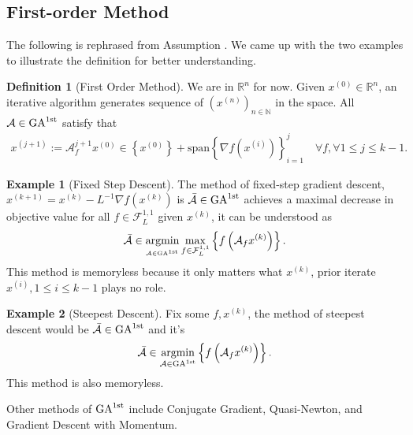 \documentclass[]{article}
\theoremstyle{definition}
\newtheorem{definition}{Definition}
\newtheorem{exmp}{Example}[section]
\numberwithin{equation}{subsection}
\begin{document}
    \subsection{First-order Method}
        The following is rephrased from Assumption \cite[2.1.4]{nesterov_lecture_2018}. 
        We came up with the two examples to illustrate the definition for better understanding. 
        \begin{definition}[First Order Method]
            We are in $\mathbb R^n$ for now. Given $x^{(0)} \in \mathbb R^n$, an iterative algorithm generates sequence of $\left(x^{(n)}\right)_{n \in \mathbb N}$ in the space. All $\mathcal A \in \text{GA}^{\text{1st}}$ satisfy that 
            \begin{align*}
                 x^{(j + 1)}:= \mathcal A_f^{j + 1}x^{(0)} \in \left\{x^{(0)}\right\} + 
                \text{span}\left\{\nabla f\left(x^{(i)}\right)\right\}_{i = 1}^{j} \quad \forall f, \forall 1\le j \le k -1. 
            \end{align*}
        \end{definition}
        \begin{exmp}[Fixed Step Descent]
            The method of fixed-step gradient descent, $x^{(k + 1)} = x^{(k)} - L^{-1}\nabla f(x^{(k)})$ is $ \bar {\mathcal A}\in \text{GA}^{\text{1st}}$ achieves a maximal decrease in objective value for all $f\in \mathcal F_{L}^{1, 1}$ given $x^{(k)}$, it can be understood as 
            \[
                \bar {\mathcal A} \in 
                \underset{_{\mathcal A\in \text{GA}^{\text{1st}}}}{\text{argmin}}
                \max_{f\in \mathcal F_L^{1, 1}} \left\lbrace
                    f\left(
                        \mathcal A_f x^{(k)}
                    \right)
                \right\rbrace. 
            \]
            This method is memoryless because it only matters what $x^{(k)}$, prior iterate $x^{(i)}, 1\le i \le k-1$ plays no role. 
        \end{exmp}
        \begin{exmp}[Steepest Descent]
            Fix some $f, x^{(k)}$, the method of steepest descent would be $\bar {\mathcal A}\in \text{GA}^{\text{1st}}$ and it's 
            \[
                \bar {\mathcal A}\in  \underset{\mathcal A \in \text{GA}^{\text{1st}}}{\text{argmin}}
                \left\lbrace
                    f\left(
                        \mathcal A_f x^{(k)}
                    \right)
                \right\rbrace. 
            \]
            This method is also memoryless.     
        \end{exmp}
        Other methods of $\text{GA}^{\text{1st}}$ include Conjugate Gradient, Quasi-Newton, and Gradient Descent with Momentum. 
\end{document}
